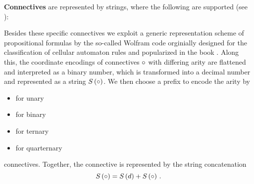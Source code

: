 \textbf{Connectives} are represented by strings, where the following are supported (see ):
\begin{center}
\end{center}

Besides these specific connectives we exploit a generic representation scheme of propositional formulas by the so-called Wolfram code orginially designed for the classification of cellular automaton rules \cite{wolfram_statistical_1983} and popularized in the book \cite{wolfram_new_2002}.
Along this, the coordinate encodings of connectives $\circ$ with differing arity are flattened and interpreted as a binary number, which is transformed into a decimal number and represented as a string $S\left(\circ\right)$.
We then choose a prefix to encode the arity by
\begin{itemize}
	\item {} for unary
	\item {} for binary
	\item {} for ternary
	\item {} for quarternary
\end{itemize}
connectives.
Together, the connective is represented by the string concatenation
	\[  S\left(\circ\right) = S\left(d\right) + S\left(\circ\right) \, . \]


